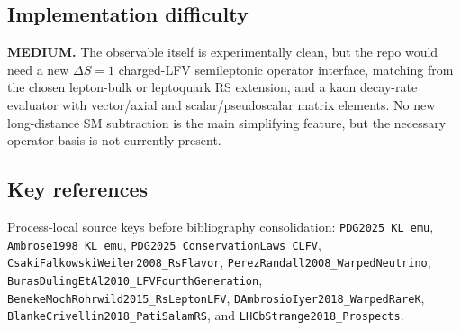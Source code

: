 \subsection*{Implementation difficulty}
\textbf{MEDIUM.}  The observable itself is experimentally clean, but the repo
would need a new \(\Delta S=1\) charged-LFV semileptonic operator interface,
matching from the chosen lepton-bulk or leptoquark RS extension, and a kaon
decay-rate evaluator with vector/axial and scalar/pseudoscalar matrix
elements.  No new long-distance SM subtraction is the main simplifying
feature, but the necessary operator basis is not currently present.

\subsection*{Key references}
Process-local source keys before bibliography consolidation:
\texttt{PDG2025\_KL\_emu}, \texttt{Ambrose1998\_KL\_emu},
\texttt{PDG2025\_ConservationLaws\_CLFV},
\texttt{CsakiFalkowskiWeiler2008\_RsFlavor},
\texttt{PerezRandall2008\_WarpedNeutrino},
\texttt{BurasDulingEtAl2010\_LFVFourthGeneration},
\texttt{BenekeMochRohrwild2015\_RsLeptonLFV},
\texttt{DAmbrosioIyer2018\_WarpedRareK},
\texttt{BlankeCrivellin2018\_PatiSalamRS}, and
\texttt{LHCbStrange2018\_Prospects}.
